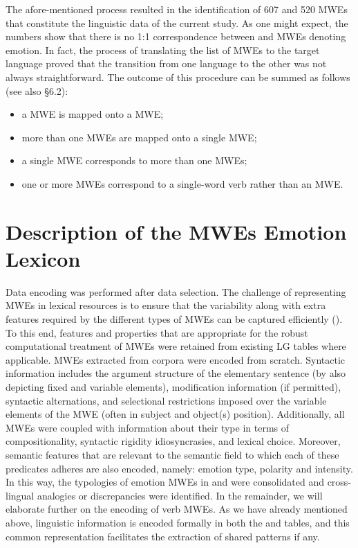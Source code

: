 \documentclass[output=paper]{langsci/langscibook}
\begin{document}
The afore-mentioned process resulted in the identification of 607 
and 520  MWEs that constitute the linguistic data of the current
study. As one might expect, the numbers show that there is no 1:1
correspondence between  and  MWEs denoting emotion. In fact, the
process of translating the list of  MWEs to the target language
proved that the transition from one language to the other was not
always straightforward. The outcome of this procedure can be summed as
follows (see also §6.2):

\begin{itemize}
\item a  MWE is mapped onto a  MWE;
\item more than one  MWEs are mapped onto a single  MWE;
\item a single  MWE corresponds to more than one  MWEs;
\item one or more  MWEs correspond to a single-word  verb rather than an
MWE.
\end{itemize}


\section{Description of the MWEs Εmotion Lexicon}

Data encoding was performed after data selection. The challenge of
representing MWEs in lexical resources is to ensure that the
variability along with extra features required by the different types
of MWEs can be captured efficiently (\citealt{calzolari2002,copestake2002}). To this end, features and properties that are appropriate
for the robust computational treatment of MWEs were retained from 
existing LG tables where applicable. MWEs extracted from corpora were
encoded from scratch. Syntactic information includes the argument structure
of the elementary sentence (by also depicting fixed and variable
elements), modification information (if permitted), syntactic
alternations, and selectional restrictions imposed over the variable
elements of the MWE (often in subject and object(s) position).
Additionally, all MWEs were coupled with information about their type
in terms of compositionality, syntactic rigidity idiosyncrasies,
and lexical choice. Moreover, semantic features that are relevant to
the semantic field to which each of these predicates adheres are also encoded, namely:
emotion type, polarity and  intensity. In this way, the typologies of
emotion MWEs in  and  were consolidated and  cross-lingual analogies
or discrepancies were identified. In the remainder, we will elaborate
further on the encoding of verb MWEs. As we have already mentioned
above, linguistic information is encoded formally in both the  and 
tables, and this common representation facilitates the extraction of shared patterns \textendash{} if any.
\end{document}
